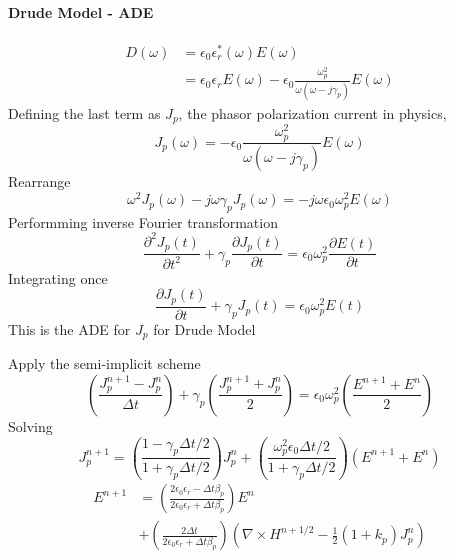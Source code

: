 \paragraph{{\msjh Drude Model - ADE}}
\begin{equation}
  \begin{split}
    D(\omega) & = \epsilon_0\epsilon_r^*(\omega)E(\omega)\\
    & = \epsilon_0 \epsilon_r E(\omega) - \epsilon_0\frac{\omega_p^2}{\omega(\omega-j\gamma_p)}E(\omega)
  \end{split}
\end{equation}
Defining the last term as $J_p$, the phasor polarization current in physics,
\begin{equation}
  J_p(\omega) = -\epsilon_0\frac{\omega_p^2}{\omega(\omega-j\gamma_p)}E(\omega)
\end{equation}
Rearrange
\begin{equation}
  \omega^2J_p(\omega) - j\omega\gamma_pJ_p(\omega) = -j\omega\epsilon_0\omega_p^2 E(\omega)
\end{equation}
Performming inverse Fourier transformation
\begin{equation}
  \frac{\partial^2 J_p(t)}{\partial t^2} + \gamma_p \frac{\partial J_p(t)}{\partial t} = \epsilon_0\omega_p^2\frac{\partial E(t)}{\partial t}
\end{equation}
Integrating once
\begin{equation}
  \frac{\partial J_p(t)}{\partial t} + \gamma_p J_p(t) = \epsilon_0 \omega_p^2 E(t)
\end{equation}
This is the ADE for $J_p$ for Drude Model

Apply the semi-implicit scheme
\begin{equation}
  \left(\frac{J_p^{n+1} - J_p^n}{\Delta t}\right) + \gamma_{p}\left(\frac{J_p^{n+1} + J_p^n}{2}\right) = \epsilon_0\omega_p^2\left(\frac{E^{n+1} + E^n}{2}\right)
\end{equation}
Solving
\begin{equation}
  J_p^{n+1} = \left(\frac{1-\gamma_p\Delta t /2}{1+\gamma_p\Delta t /2}\right)J_p^n + \left(\frac{\omega_p^2\epsilon_0\Delta t /2}{1+\gamma_p\Delta t /2}\right)\left(E^{n+1}+E^n\right)
\end{equation}
\begin{equation}
  \begin{split}
    E^{n+1} & = \left(\frac{2\epsilon_0\epsilon_r - \Delta t \beta_p}{2\epsilon_0\epsilon_r + \Delta t \beta_p}\right)E^n \\
    & + \left(\frac{2\Delta t}{2\epsilon_0\epsilon_r + \Delta t \beta_p}\right)\left(\nabla\times H^{n+1/2} - \frac{1}{2}(1+k_p)J_p^n\right)
  \end{split}
\end{equation}



